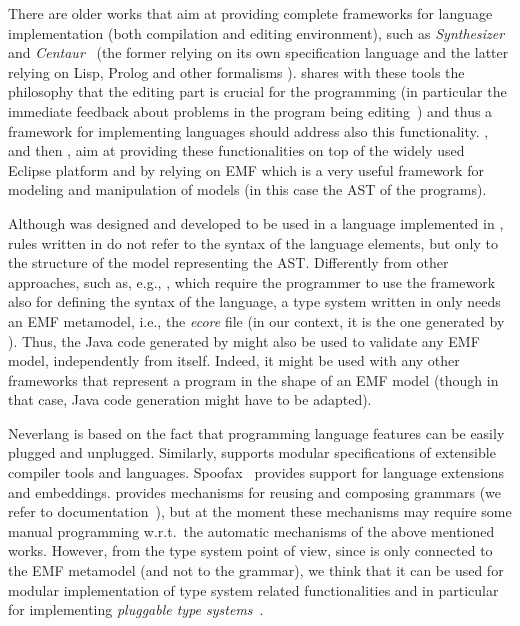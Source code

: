 There are older works that aim at providing complete frameworks for language
implementation (both compilation and editing environment), such as
\emph{Synthesizer}~\cite{Synthesizer} and \emph{Centaur}~\cite{Centaur} (the
former relying on its own specification language and the latter relying on Lisp,
Prolog and other formalisms \cite{Metal,PPML,Typol}). \xtext{} shares with
these tools the philosophy that the editing part is crucial for the programming
(in particular the immediate feedback about problems in the program being
editing~\cite{Synthesizer}) and thus a framework for implementing languages
should address also this functionality.  \xtext, and then \xtypes, aim at
providing these functionalities on top of the widely used Eclipse platform and
by relying on EMF which is a very useful framework for modeling and manipulation
of models (in this case the AST of the programs).

Although \xtypes{} was designed and developed to be used in a language
implemented in \xtext, rules written in \xtypes{} do not refer to the syntax of
the language elements, but only to the structure of the model representing the
AST.  Differently from other approaches, such as, e.g.,
\cite{Centaur,MPS,ASFSDF,Ruler,PLTRedex,EriLex,Neverlang2010}, which require the
programmer to use the framework also for defining the syntax of the language, a
type system written in \xtypes{} only needs an EMF metamodel, i.e., the
\emph{ecore} file (in our context, it is the one generated by \xtext). Thus, the
Java code generated by \xtypes{} might also be used to validate any EMF model,
independently from \xtext{} itself.  Indeed, it might be used with any other
frameworks that represent a program in the shape of an EMF model (though in that
case, Java code generation might have to be adapted).

Neverlang \cite{Neverlang2010} is based on the fact that programming language
features can be easily plugged and unplugged. Similarly, \cite{JastAdd} supports
modular specifications of extensible compiler tools and languages.
Spoofax~\cite{Spoofax2010} provides support for language extensions and
embeddings. \xtext{} provides mechanisms for reusing and composing grammars (we
refer to \xtext{} documentation~\cite{xtext}), but at the moment these
mechanisms may require some manual programming w.r.t.\ the automatic
mechanisms of the above mentioned works. However, from the type system point of
view, since \xtypes{} is only connected to the EMF metamodel (and not to the
grammar), we think that it can be used for modular implementation of type system
related functionalities and in particular for implementing \emph{pluggable type
systems}~\cite{Brac04a}.

